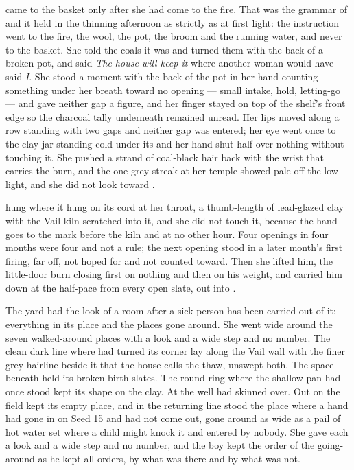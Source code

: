  came to the basket only after she had come to the fire. That was the grammar of  and it held in the thinning afternoon as strictly as at first light: the instruction went to the fire, the wool, the pot, the broom and the running water, and never to the basket. She told the coals it was  and turned them with the back of a broken pot, and said \emph{The house will keep it} where another woman would have said \emph{I}. She stood a moment with the back of the pot in her hand counting something under her breath toward no opening --- small intake, hold, letting-go --- and gave neither gap a figure, and her finger stayed on top of the shelf's front edge so the charcoal tally underneath remained unread. Her lips moved along a row standing with two gaps and neither gap was entered; her eye went once to the clay jar standing cold under its  and her hand shut half over nothing without touching it. She pushed a strand of coal-black hair back with the wrist that carries the burn, and the one grey streak at her temple showed pale off the low light, and she did not look toward .

 hung where it hung on its cord at her throat, a thumb-length of lead-glazed clay with the Vail kiln scratched into it, and she did not touch it, because the hand goes to the mark before the kiln and at no other hour. Four openings in four months were four and not a rule; the next opening stood in a later month's first firing, far off, not hoped for and not counted toward. Then she lifted him, the little-door burn closing first on nothing and then on his weight, and carried him down at the half-pace from every open slate, out into .

The yard had the look of a room after a sick person has been carried out of it: everything in its place and the places gone around. She went wide around the seven walked-around places with a look and a wide step and no number. The clean dark line where  had turned its corner lay along the Vail wall with the finer grey hairline beside it that the house calls the thaw, unswept both. The space beneath  held its broken birth-slates. The round ring where the shallow pan had once stood kept its shape on the clay. At the well  had skinned over. Out on  the field kept its empty place, and in the returning line stood the place where a hand had gone in on Seed 15 and had not come out, gone around as wide as a pail of hot water set where a child might knock it and entered by nobody. She gave each a look and a wide step and no number, and the boy kept the order of the going-around as he kept all orders, by what was there and by what was not.

